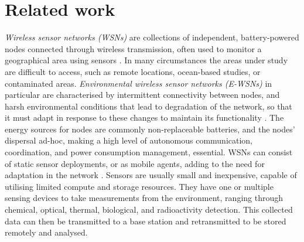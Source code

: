 \section{Related work}
\label{section:background}

\textit{Wireless sensor networks (WSNs)} are collections of independent, battery-powered nodes connected through wireless transmission, often used to monitor a geographical area using sensors \citep{Akyildiz,Yick2008a}. In many circumstances the areas under study are difficult to access, such as remote locations, ocean-based studies, or contaminated areas. \textit{Environmental wireless sensor networks (E-WSNs)} in particular are characterised by intermittent connectivity between nodes, and harsh environmental conditions that lead to degradation of the network, so that it must adapt in response to these changes to maintain its functionality \citep{Oliveira2011}. The energy sources for nodes are commonly non-replaceable batteries, and the nodes' dispersal ad-hoc, making a high level of autonomous communication, coordination, and power consumption management, essential. WSNs can consist of static sensor deployments, or as mobile agents, adding to the need for adaptation in the network \citep{ramasamy2017mobile, 4224091}. Sensors are usually small and inexpensive, capable of utilising limited compute and storage resources. They have one or multiple sensing devices to take measurements from the environment, ranging through chemical, optical, thermal, biological, and radioactivity detection. This collected data can then be transmitted to a base station and retransmitted to be stored remotely and analysed.

